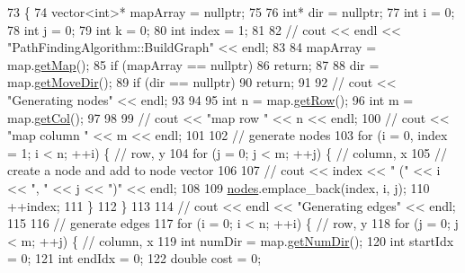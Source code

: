 \begin{DoxyCode}
73                                           \{
74     vector<int>* mapArray = \textcolor{keyword}{nullptr};
75 
76     \textcolor{keywordtype}{int}* dir = \textcolor{keyword}{nullptr};
77     \textcolor{keywordtype}{int} i = 0;
78     \textcolor{keywordtype}{int} j = 0;
79     \textcolor{keywordtype}{int} k = 0;
80     \textcolor{keywordtype}{int} index = 1;
81 
82     \textcolor{comment}{// cout << endl << "PathFindingAlgorithm::BuildGraph" << endl;}
83 
84     mapArray = map.\hyperlink{classMap_ad5c4312f11909eafc091715686b6ceda}{getMap}();
85     \textcolor{keywordflow}{if} (mapArray == \textcolor{keyword}{nullptr})
86         \textcolor{keywordflow}{return};
87 
88     dir = map.\hyperlink{classMap_a4f9142718a50c64152465aacc1033f26}{getMoveDir}();
89     \textcolor{keywordflow}{if} (dir == \textcolor{keyword}{nullptr})
90         \textcolor{keywordflow}{return};
91 
92     \textcolor{comment}{// cout << "Generating nodes" << endl;}
93 
94 
95     \textcolor{keywordtype}{int} n = map.\hyperlink{classMap_a80e0ea134ccb9a22092ce4c520063cd2}{getRow}();
96     \textcolor{keywordtype}{int} m = map.\hyperlink{classMap_a88d24c08a4669040d7de6bd5f6272862}{getCol}();
97 
98 
99     \textcolor{comment}{// cout << "map row " << n << endl;}
100     \textcolor{comment}{// cout << "map column " << m << endl;}
101 
102     \textcolor{comment}{// generate nodes}
103     \textcolor{keywordflow}{for} (i = 0, index = 1; i < n; ++i) \{  \textcolor{comment}{// row, y}
104         \textcolor{keywordflow}{for} (j = 0; j < m; ++j) \{  \textcolor{comment}{// column, x}
105             \textcolor{comment}{// create a node and add to node vector}
106 
107             \textcolor{comment}{// cout << index << " (" << i << ", " << j << ")" << endl;}
108 
109             \hyperlink{classPathFindingAlgorithm_a3405321350d5fb10ba367c47944a7b77}{nodes}.emplace\_back(index, i, j);
110             ++index;
111         \}
112     \}
113 
114     \textcolor{comment}{// cout << endl << "Generating edges" << endl;}
115 
116     \textcolor{comment}{// generate edges}
117     \textcolor{keywordflow}{for} (i = 0; i < n; ++i) \{  \textcolor{comment}{// row, y}
118         \textcolor{keywordflow}{for} (j = 0; j < m; ++j) \{  \textcolor{comment}{// column, x}
119             \textcolor{keywordtype}{int} numDir = map.\hyperlink{classMap_a04501949c81ac8dd6a7aeaca908fe969}{getNumDir}();
120             \textcolor{keywordtype}{int} startIdx = 0;
121             \textcolor{keywordtype}{int} endIdx = 0;
122             \textcolor{keywordtype}{double} cost = 0;

\end{DoxyCode}

